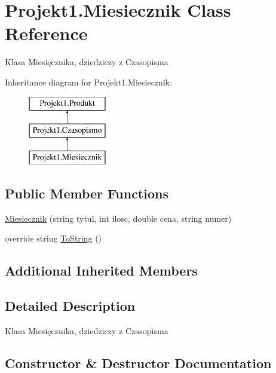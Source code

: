 \hypertarget{class_projekt1_1_1_miesiecznik}{}\section{Projekt1.\+Miesiecznik Class Reference}
\label{class_projekt1_1_1_miesiecznik}


Klasa Miesięcznika, dziedziczy z Czasopisma  


Inheritance diagram for Projekt1.\+Miesiecznik\+:\begin{figure}[H]
\begin{center}
\leavevmode
\includegraphics[height=3.000000cm]{class_projekt1_1_1_miesiecznik}
\end{center}
\end{figure}
\subsection*{Public Member Functions}
\begin{DoxyCompactItemize}
\item 
\mbox{\hyperlink{class_projekt1_1_1_miesiecznik_a74d1430a4b00f07eb988c7ed4eda845e}{Miesiecznik}} (string tytul, int ilosc, double cena, string numer)
\item 
override string \mbox{\hyperlink{class_projekt1_1_1_miesiecznik_ad372fc0103861869a3d80a454afcc59f}{To\+String}} ()
\end{DoxyCompactItemize}
\subsection*{Additional Inherited Members}


\subsection{Detailed Description}
Klasa Miesięcznika, dziedziczy z Czasopisma 



\subsection{Constructor \& Destructor Documentation}
\mbox{\label{class_projekt1_1_1_miesiecznik_a74d1430a4b00f07eb988c7ed4eda845e}} 

